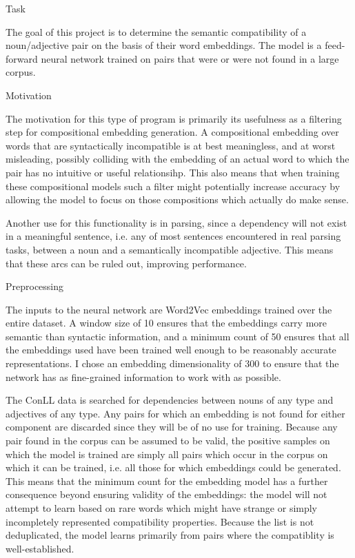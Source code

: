 Task

The goal of this project is to determine the semantic compatibility of a noun/adjective pair on the basis of their word embeddings. The model is a feed-forward neural network trained on pairs that were or were not found in a large corpus.


Motivation

The motivation for this type of program is primarily its usefulness as a filtering step for compositional embedding generation. A compositional embedding over words that are syntactically incompatible is at best meaningless, and at worst misleading, possibly colliding with the embedding of an actual word to which the pair has no intuitive or useful relationsihp. This also means that when training these compositional models such a filter might potentially increase accuracy by allowing the model to focus on those compositions which actually do make sense.

Another use for this functionality is in parsing, since a dependency will not exist in a meaningful sentence, i.e. any of most sentences encountered in real parsing tasks, between a noun and a semantically incompatible adjective. This means that these arcs can be ruled out, improving performance.


Preprocessing

The inputs to the neural network are Word2Vec embeddings trained over the entire dataset. A window size of 10 ensures that the embeddings carry more semantic than syntactic information, and a minimum count of 50 ensures that all the embeddings used have been trained well enough to be reasonably accurate representations. I chose an embedding dimensionality of 300 to ensure that the network has as fine-grained information to work with as possible.

The ConLL data is searched for dependencies between nouns of any type and adjectives of any type. Any pairs for which an embedding is not found for either component are discarded since they will be of no use for training. Because any pair found in the corpus can be assumed to be valid, the positive samples on which the model is trained are simply all pairs which occur in the corpus on which it can be trained, i.e. all those for which embeddings could be generated. This means that the minimum count for the embedding model has a further consequence beyond ensuring validity of the embeddings: the model will not attempt to learn based on rare words which might have strange or simply incompletely represented compatibility properties. Because the list is not deduplicated, the model learns primarily from pairs where the compatiblity is well-established.


